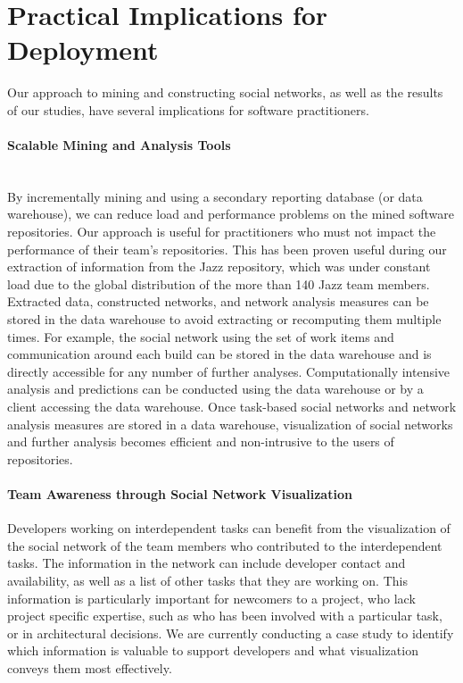 \section{Practical Implications for Deployment} 

Our approach to mining and constructing social networks, as well as the results
of our studies, have several implications for software practitioners.

\paragraph{Scalable Mining and Analysis Tools}
\ \\
By incrementally mining and using a secondary reporting database (or data
warehouse), we can reduce load and performance problems on the mined software
repositories. Our approach is useful for practitioners who must not impact the
performance of their team's repositories.
This has been proven useful during our extraction of information from the Jazz
repository, which was under constant load due to the global distribution of the
more than 140 Jazz team members.
%
Extracted data, constructed networks, and network analysis measures can be stored
in the data warehouse to avoid extracting or recomputing them multiple times. For
example, the social network using the set of work items and communication around
each build can be stored in the data warehouse and is directly accessible for any
number of further analyses. Computationally intensive analysis and predictions
can be conducted using the data warehouse or by a client accessing the data
warehouse. Once task-based social networks and network analysis measures are
stored in a data warehouse, visualization of social networks and further analysis
becomes efficient and non-intrusive to the users of repositories.


\paragraph{Team Awareness through Social Network Visualization}
Developers working on interdependent tasks can benefit from the visualization of
the social network of the team members who contributed to the interdependent
tasks. The information in the network can include developer contact and
availability, as well as a list of other tasks that they are working on. This
information is particularly important for newcomers to a project, who lack
project specific expertise, such as who has been involved with a particular task,
or in architectural decisions.
We are currently conducting a case study to identify which information is
valuable to support developers and what visualization conveys them most
effectively.
 



